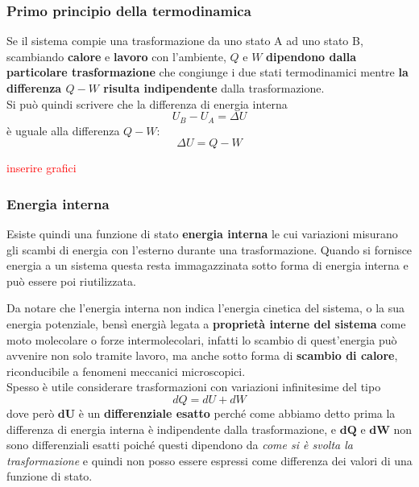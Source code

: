 \documentclass[x11names]{article}
\begin{document}
	
	\begin{center}
		\colorbox{myred}{\begin{minipage}{5.75in}
				\begin{redes}{}
					\subsubsection{Primo principio della termodinamica}
					Se il sistema compie una trasformazione da uno stato A ad uno stato B, scambiando \textbf{calore} e \textbf{lavoro} con l'ambiente, \(Q\) e \(W\) \textbf{dipendono dalla particolare trasformazione} che congiunge i due stati termodinamici mentre \textbf{la differenza \(Q-W\) risulta indipendente} dalla trasformazione.\\
					
					Si può quindi scrivere che la differenza di energia interna 
					\[ 
					U_B - U_A = \Delta U 
					\]
					è uguale alla differenza \(Q-W\):
					\begin{equation}\label{primoprincipio}
						\Delta U = Q -W
					\end{equation}
				\end{redes}
		\end{minipage}}
	\end{center}
	\begin{center}
		\textcolor{red}{inserire grafici}
	\end{center}
	
	\subsubsection{Energia interna}
	Esiste quindi una funzione di stato \textbf{energia interna} le cui variazioni misurano gli scambi di energia con l'esterno durante una trasformazione. Quando si fornisce energia a un sistema questa resta immagazzinata sotto forma di energia interna e può essere poi riutilizzata.
	
	Da notare che l'energia interna non indica l'energia cinetica del sistema, o la sua energia potenziale, bensì energià legata a \textbf{proprietà interne del sistema} come moto molecolare o forze intermolecolari, infatti lo scambio di quest'energia  può avvenire non solo tramite lavoro, ma anche sotto forma di \textbf{scambio di calore}, riconducibile a fenomeni meccanici microscopici.\\
	
	\noindent
	Spesso è utile considerare trasformazioni con variazioni infinitesime del tipo
	\[ 
	dQ = dU + dW
	\]
	dove però \(\boldsymbol{dU}\) è un \textbf{differenziale esatto} perché come abbiamo detto prima la differenza di energia interna è indipendente dalla trasformazione, e \(\boldsymbol{dQ}\) e \(\boldsymbol{dW}\) non sono differenziali esatti poiché questi dipendono da \textit{come si è svolta la trasformazione} e quindi non posso essere espressi come differenza dei valori di una funzione di stato.
	
\end{document}
